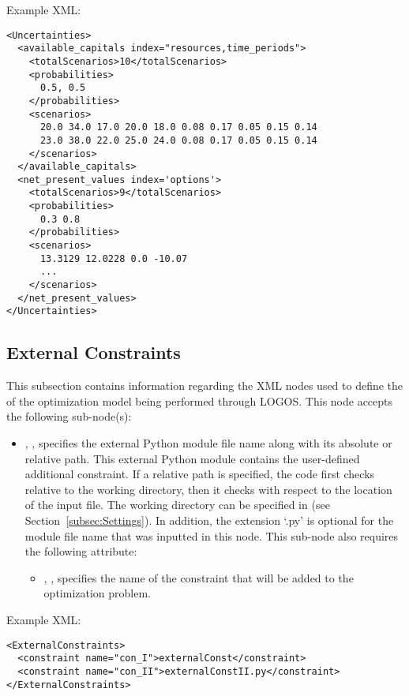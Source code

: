 Example XML:
\begin{lstlisting}[style=XML]
<Uncertainties>
  <available_capitals index="resources,time_periods">
    <totalScenarios>10</totalScenarios>
    <probabilities>
      0.5, 0.5
    </probabilities>
    <scenarios>
      20.0 34.0 17.0 20.0 18.0 0.08 0.17 0.05 0.15 0.14
      23.0 38.0 22.0 25.0 24.0 0.08 0.17 0.05 0.15 0.14
    </scenarios>
  </available_capitals>
  <net_present_values index='options'>
    <totalScenarios>9</totalScenarios>
    <probabilities>
      0.3 0.8
    </probabilities>
    <scenarios>
      13.3129 12.0228 0.0 -10.07
      ...
    </scenarios>
  </net_present_values>
</Uncertainties>
\end{lstlisting}


%
\subsection{External Constraints}
\label{subsec:ExternalConstraints}

This subsection contains information regarding the XML nodes used to define the
 of the optimization model being performed through LOGOS.
This node accepts the following sub-node(s):
\begin{itemize}
  \item {}, , specifies the external Python
  module file name along with its absolute or relative path. This external Python
  module contains the user-defined additional constraint.
  \nb If a relative path is specified, the code first checks relative to the working directory,
  then it checks with respect to the location of the input file. The working directory can be
  specified in  (see Section~\ref{subsec:Settings}). In addition, the extension
  `.py' is optional for the module file name that was inputted in this node.
  This sub-node also requires the following attribute:
  \begin{itemize}
    \item {}, , specifies the name of the constraint that will
    be added to the optimization problem.
  \end{itemize}
\end{itemize}

Example XML:
\begin{lstlisting}[style=XML]
<ExternalConstraints>
  <constraint name="con_I">externalConst</constraint>
  <constraint name="con_II">externalConstII.py</constraint>
</ExternalConstraints>
\end{lstlisting}

